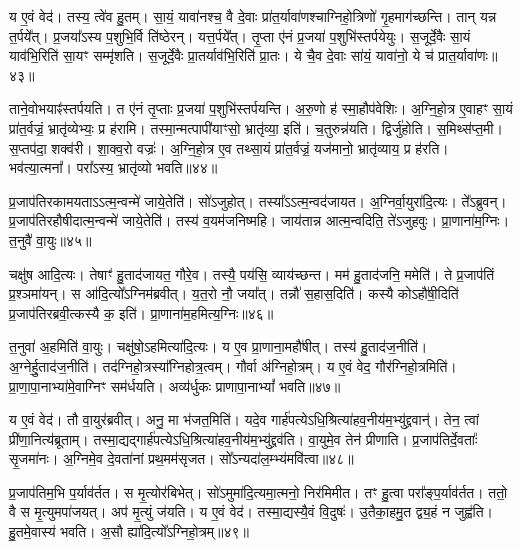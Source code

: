 य ए॒वं वेद॑।
तस्य॒ त्वे॑व हु॒तम्।
सा॒यं॒ यावा॑नश्च॒ वै दे॒वाः प्रा॑त॒र्यावा॑णश्चाग्निहो॒त्रिणो॑ गृ॒हमाग॑च्छन्ति।
तान् यन्न त॒र्पये᳚त्।
प्र॒जया᳚ऽस्य प॒शुभि॒र्वि ति॑ष्ठेरन्।
यत्त॒र्पये᳚त्।
तृ॒प्ता ए॑नं प्र॒जया॑ प॒शुभि॑स्तर्पयेयुः।
स॒जूर्दे॒वैः सा॒यं याव॑भि॒रिति॑ सा॒यꣳ सम्मृ॑शति।
स॒जूर्दे॒वैः प्रा॒तर्याव॑भि॒रिति॑ प्रा॒तः।
ये चै॒व दे॒वाः सा॑यं॒ यावा॑नो॒ ये च॑ प्रात॒र्यावा॑णः॥४३॥

ताने॒वोभयाꣴ॑स्तर्पयति।
त ए॑नं तृ॒प्ताः प्र॒जया॑ प॒शुभि॑स्तर्प\-यन्ति।
अ॒रु॒णो ह॑ स्मा॒हौप॑वेशिः।
अ॒ग्नि॒हो॒त्र ए॒वाहꣳ सा॒यं प्रा॑त॒र्वज्रं॒ भ्रातृ॑व्येभ्यः॒ प्र ह॑रामि।
तस्मा॒न्मत्पापी॑याꣳसो॒ भ्रातृ॑व्या॒ इति॑।
च॒तुरुन्न॑यति।
द्विर्जु॑होति।
स॒मिथ्स॑प्त॒मी।
स॒प्तप॑दा॒ शक्व॑री।
शा॒क्व॒रो वज्रः॑।
अ॒ग्नि॒हो॒त्र ए॒व तथ्सा॒यं प्रा॑त॒र्वज्रं॒ यज॑मानो॒ भ्रातृ॑व्याय॒ प्र ह॑रति।
भव॑त्या॒त्मना᳚।
परा᳚ऽस्य॒ भ्रातृ॑व्यो भवति॥४४॥

प्र॒जा\-प॑तिरकामयता\-ऽऽत्म॒न्वन्मे॑ जाये॒तेति॑।
सो॑ऽजुहोत्।
तस्या᳚\-ऽऽत्म॒न्वद॑जायत।
अ॒ग्निर्वा॒युरा॑दि॒त्यः।
ते᳚ऽब्रुवन्।
प्र॒जा\-प॑तिर\-हौषी\-दात्म॒न्वन्मे॑ जाये॒तेति॑।
तस्य॑ व॒यम॑जनिष्महि।
जाय॑तान्न आत्म॒न्वदिति॒ ते॑\-ऽजुहवुः।
प्रा॒णाना॑म॒ग्निः।
त॒नुवै॑ वा॒युः॥४५॥

चक्षु॑ष आदि॒त्यः।
तेषाꣳ॑ हु॒ताद॑जायत॒ गौरे॒व।
तस्यै॒ पय॑सि॒ व्याय॑च्छन्त।
मम॑ हु॒ताद॑जनि॒ ममेति॑।
ते प्र॒जा\-प॑तिं प्र॒श्ञमा॑यन्।
स आ॑दि॒त्यो᳚\-ऽग्निम॑ब्रवीत्।
य॒त॒रो नौ॒ जया᳚त्।
तन्नौ॑ स॒हास॒दिति॑।
कस्यै कोऽहौ॑षी॒दिति॑ प्र॒जा\-प॑तिरब्रवी॒त्कस्यै क॒ इति॑।
प्रा॒णाना॑म॒हमित्य॒ग्निः॥४६॥

त॒नुवा॑ अ॒हमिति॑ वा॒युः।
चक्षु॑षो॒\-ऽहमित्या॑दि॒त्यः।
य ए॒व प्रा॒णाना॒महौ॑षीत्।
तस्य॑ हु॒ताद॑ज॒नीति॑।
अ॒ग्नेर्\mbox{}हु॒ताद॑ज॒नीति॑।
तद॑ग्निहो॒त्रस्या᳚ग्निहोत्र॒त्वम्।
गौर्वा अ॑ग्निहो॒त्रम्।
य ए॒वं वेद॒ गौर॑ग्निहो॒त्रमिति॑।
प्रा॒णा॒पा॒नाभ्या॑मे॒वाग्निꣳ सम॑र्धयति।
अव्य॑र्धुकः प्राणापा॒नाभ्यां᳚ भवति॥४७॥

य ए॒वं वेद॑।
तौ वा॒युर॑ब्रवीत्।
अनु॒ मा भ॑जत॒मिति॑।
यदे॒व गार्\mbox{}ह॑पत्ये\-ऽधि॒श्रित्या॑हव॒नीय॑म॒भ्यु॑द्द्रवान्॑।
तेन॒ त्वां प्री॑णा॒नित्य॑ब्रूताम्।
तस्मा॒द्यद्गार्\mbox{}ह॑पत्ये\-ऽधि॒श्रित्या॑हव॒नीय॑\-म॒भ्यु॑द्द्रव॑ति।
वा॒युमे॒व तेन॑ प्रीणाति।
प्र॒जा\-प॑तिर्दे॒वताः᳚ सृ॒जमा॑नः।
अ॒ग्निमे॒व दे॒वता॑नां प्रथ॒मम॑\-सृजत।
सो᳚ऽन्यदा॑\-ल॒म्भ्य॑मवि॑त्वा॥४८॥

प्र॒जा\-प॑तिम॒भि प॒र्याव॑र्तत।
स मृ॒त्योर॑बिभेत्।
सो॑ऽमुमा॑दि॒त्य\-मा॒त्मनो॒ निर॑मिमीत।
तꣳ हु॒त्वा परा᳚ङ्प॒र्याव॑र्तत।
ततो॒ वै स मृ॒त्युमपा॑जयत्।
अप॑ मृ॒त्युं ज॑यति।
य ए॒वं वेद॑।
तस्मा॒द्यस्यै॒वं वि॒दुषः॑।
उ॒तैका॒हमु॒त द्व्य॒हं न जुह्व॑ति।
हु॒तमे॒वास्य॑ भवति।
अ॒सौ ह्या॑दि॒त्यो᳚\-ऽग्निहो॒त्रम्॥४९॥\anuvakamend[त॒नुवै॑ वा॒युर॒ग्निर्भ॑व॒त्यवि॑त्वा भव॒त्येकं॑ च]

